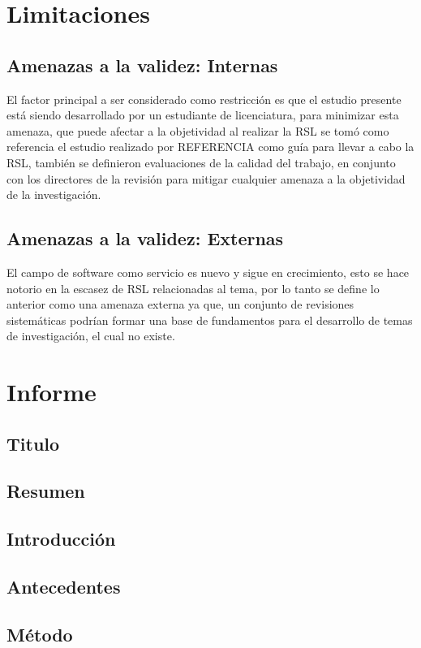 \documentclass{article}
\begin{document}
\section{Limitaciones}
\subsection{Amenazas a la validez: Internas}
El factor principal a ser considerado como restricción es que el estudio presente está siendo 
desarrollado por un estudiante de licenciatura, para minimizar esta amenaza, que puede afectar a la objetividad 
al realizar la RSL se tomó como referencia el estudio realizado por REFERENCIA 
como guía para llevar a cabo la RSL, también se definieron evaluaciones de la calidad del trabajo, en conjunto 
con los directores de la revisión para mitigar cualquier amenaza a la objetividad de la investigación. 

\subsection{Amenazas a la validez: Externas}
El campo de software como servicio es nuevo y sigue en crecimiento, esto se hace notorio en la escasez de 
RSL relacionadas al tema, por lo tanto se define lo anterior como  una amenaza externa ya que, un conjunto 
de revisiones sistemáticas podrían formar una base de fundamentos para el desarrollo de temas de investigación, el cual no existe.
\newpage


\section{Informe}
\subsection{Titulo}
\subsection{Resumen}
\subsection{Introducción}
\subsection{Antecedentes}
\subsection{Método}
\end{document}
